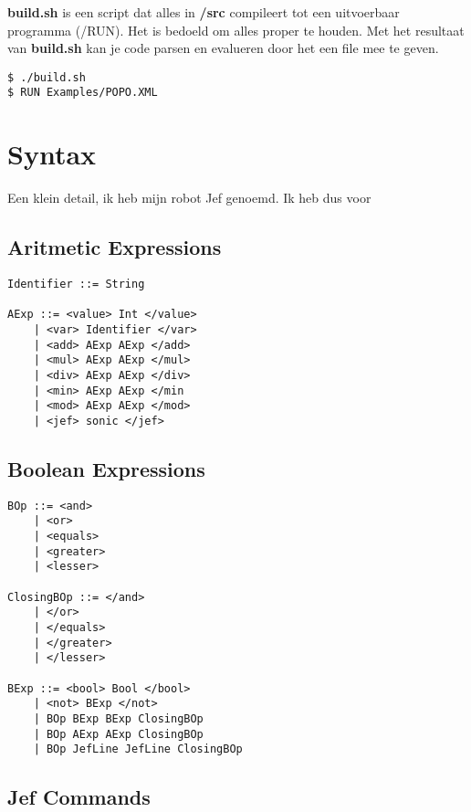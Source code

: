 \documentclass[]{article}
\begin{document}
\textbf{build.sh} is een script dat alles in \textbf{/src} compileert tot een uitvoerbaar programma (/RUN). Het is bedoeld om alles proper te houden. Met het resultaat van \textbf{build.sh}  kan je code parsen en evalueren door het een file mee te geven. 
\begin{lstlisting}
$ ./build.sh
$ RUN Examples/POPO.XML
\end{lstlisting}

\newpage
\section{Syntax}
Een klein detail, ik heb mijn robot Jef genoemd.  Ik heb dus voor 

\subsection{Aritmetic Expressions}

\begin{lstlisting}
Identifier ::= String

AExp ::= <value> Int </value>
    | <var> Identifier </var>
    | <add> AExp AExp </add>
    | <mul> AExp AExp </mul>
    | <div> AExp AExp </div>
    | <min> AExp AExp </min
    | <mod> AExp AExp </mod>
    | <jef> sonic </jef>
\end{lstlisting}

\-

\subsection{Boolean Expressions}
\begin{lstlisting}
BOp ::= <and>
    | <or>
    | <equals>
    | <greater>
    | <lesser>

ClosingBOp ::= </and>
    | </or>
    | </equals>
    | </greater>
    | </lesser>

BExp ::= <bool> Bool </bool>
    | <not> BExp </not>
    | BOp BExp BExp ClosingBOp
    | BOp AExp AExp ClosingBOp
    | BOp JefLine JefLine ClosingBOp
\end{lstlisting}

\newpage

\subsection{Jef Commands}
\end{document}
